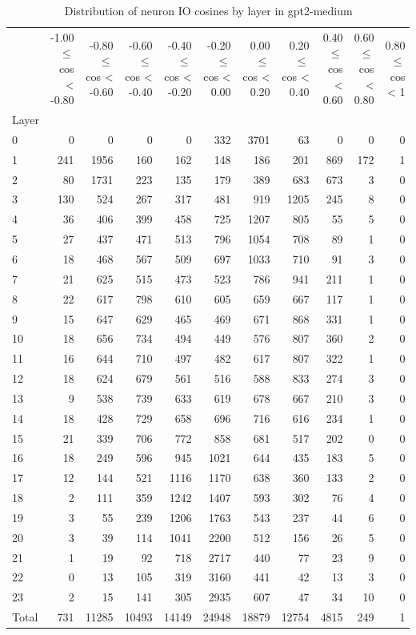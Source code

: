 \begin{table}
\caption{Distribution of neuron IO cosines by layer in gpt2-medium}
\label{tab:gpt2-medium_half_coarse}
\begin{tabular}{lrrrrrrrrrr}
 & -1.00 $\leq$ cos < -0.80 & -0.80 $\leq$ cos < -0.60 & -0.60 $\leq$ cos < -0.40 & -0.40 $\leq$ cos < -0.20 & -0.20 $\leq$ cos < 0.00 & 0.00 $\leq$ cos < 0.20 & 0.20 $\leq$ cos < 0.40 & 0.40 $\leq$ cos < 0.60 & 0.60 $\leq$ cos < 0.80 & 0.80 $\leq$ cos < 1 \\
Layer &  &  &  &  &  &  &  &  &  &  \\
0 & 0 & 0 & 0 & 0 & 332 & 3701 & 63 & 0 & 0 & 0 \\
1 & 241 & 1956 & 160 & 162 & 148 & 186 & 201 & 869 & 172 & 1 \\
2 & 80 & 1731 & 223 & 135 & 179 & 389 & 683 & 673 & 3 & 0 \\
3 & 130 & 524 & 267 & 317 & 481 & 919 & 1205 & 245 & 8 & 0 \\
4 & 36 & 406 & 399 & 458 & 725 & 1207 & 805 & 55 & 5 & 0 \\
5 & 27 & 437 & 471 & 513 & 796 & 1054 & 708 & 89 & 1 & 0 \\
6 & 18 & 468 & 567 & 509 & 697 & 1033 & 710 & 91 & 3 & 0 \\
7 & 21 & 625 & 515 & 473 & 523 & 786 & 941 & 211 & 1 & 0 \\
8 & 22 & 617 & 798 & 610 & 605 & 659 & 667 & 117 & 1 & 0 \\
9 & 15 & 647 & 629 & 465 & 469 & 671 & 868 & 331 & 1 & 0 \\
10 & 18 & 656 & 734 & 494 & 449 & 576 & 807 & 360 & 2 & 0 \\
11 & 16 & 644 & 710 & 497 & 482 & 617 & 807 & 322 & 1 & 0 \\
12 & 18 & 624 & 679 & 561 & 516 & 588 & 833 & 274 & 3 & 0 \\
13 & 9 & 538 & 739 & 633 & 619 & 678 & 667 & 210 & 3 & 0 \\
14 & 18 & 428 & 729 & 658 & 696 & 716 & 616 & 234 & 1 & 0 \\
15 & 21 & 339 & 706 & 772 & 858 & 681 & 517 & 202 & 0 & 0 \\
16 & 18 & 249 & 596 & 945 & 1021 & 644 & 435 & 183 & 5 & 0 \\
17 & 12 & 144 & 521 & 1116 & 1170 & 638 & 360 & 133 & 2 & 0 \\
18 & 2 & 111 & 359 & 1242 & 1407 & 593 & 302 & 76 & 4 & 0 \\
19 & 3 & 55 & 239 & 1206 & 1763 & 543 & 237 & 44 & 6 & 0 \\
20 & 3 & 39 & 114 & 1041 & 2200 & 512 & 156 & 26 & 5 & 0 \\
21 & 1 & 19 & 92 & 718 & 2717 & 440 & 77 & 23 & 9 & 0 \\
22 & 0 & 13 & 105 & 319 & 3160 & 441 & 42 & 13 & 3 & 0 \\
23 & 2 & 15 & 141 & 305 & 2935 & 607 & 47 & 34 & 10 & 0 \\
Total & 731 & 11285 & 10493 & 14149 & 24948 & 18879 & 12754 & 4815 & 249 & 1 \\
\end{tabular}
\end{table}
